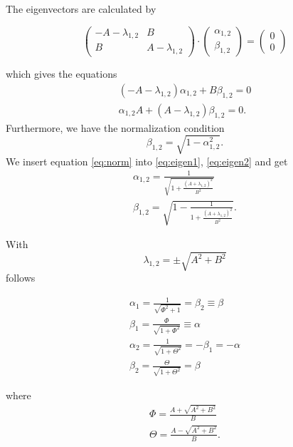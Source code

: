 The eigenvectors are calculated by

\begin{equation}
\begin{pmatrix}
-A-\lambda_{1,2} & B\\
B & A-\lambda_{1,2}
\end{pmatrix} \cdot 
\begin{pmatrix}
\alpha_{1,2} \\ \beta_{1,2}
\end{pmatrix} =
\begin{pmatrix}
0 \\ 0
\end{pmatrix}
\end{equation}

which gives the equations 
\begin{eqnarray}
\left(-A-\lambda_{1,2}\right)\alpha_{1,2}+B\beta_{1,2}=0 \label{eq:eigen1}\\
\alpha_{1,2}A+\left(A-\lambda_{1,2}\right)\beta_{1,2}=0. \label{eq:eigen2}
\end{eqnarray}
Furthermore, we have the normalization condition
\begin{equation}\label{eq:norm}
\beta_{1,2}=\sqrt{1-\alpha_{1,2}^2}.
\end{equation}
We insert equation \eqref{eq:norm} into \eqref{eq:eigen1}, \eqref{eq:eigen2} and get
\begin{eqnarray}
\alpha_{1,2}=\frac{1}{\sqrt{1+\frac{\left(A+\lambda_{1,2}\right)^2}{B^2}}}\\
\beta_{1,2}=\sqrt{1-\frac{1}{1+\frac{\left(A+\lambda_{1,2}\right)^2}{B^2}}}.
\end{eqnarray}

With 
\begin{equation}
\lambda_{1,2}=\pm\sqrt{A^2+B^2}
\end{equation}
follows

\begin{equation}
\label{eq:ab}
\begin{aligned}
\alpha_{1}=\frac{1}{\sqrt{\Phi^2+1}}=\beta_2\equiv\beta\\
\beta_{1}=\frac{\Phi}{\sqrt{1+\Phi^2}}\equiv\alpha\\
\alpha_{2}=\frac{1}{\sqrt{1+\Theta^2}}=-\beta_1=-\alpha\\
\beta_{2}=\frac{\Theta}{\sqrt{1+\Theta^2}}=\beta
\end{aligned}
\end{equation}

where 
\begin{equation}
\label{eq:abcont}
\begin{aligned}
\Phi=\frac{A+\sqrt{A^2+B^2}}{B}\\
\Theta=\frac{A-\sqrt{A^2+B^2}}{B}.
\end{aligned}
\end{equation}



